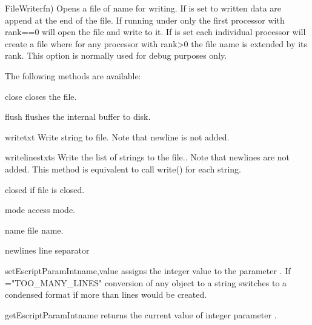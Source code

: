 \begin{classdesc}{FileWriter}{fn)}
Opens a file of name  for writing. If  is set to \True
written data are append at the end of the file.
If running under \MPI only the first processor with rank==0
will open the file and write to it.
If  is set each individual processor will create a file
where for any processor with rank>0 the file name is extended by its rank. This option is normally used for debug purposes only.
\end{classdesc}

The following methods are available:
\begin{methoddesc}[FileWriter]{close}{}
closes the file.
\end{methoddesc}
\begin{methoddesc}[FileWriter]{flush}{}
flushes the internal buffer to disk.
\end{methoddesc}
\begin{methoddesc}[FileWriter]{write}{txt}
Write string  to file.
Note that newline is not added.
\end{methoddesc}
\begin{methoddesc}[FileWriter]{writelines}{txts}
Write the list  of strings to the file..
Note that newlines are not added.
This method is equivalent to call write() for each string.
\end{methoddesc}
\begin{memberdesc}[FileWriter]{closed}
\True if file is closed.
\end{memberdesc}
\begin{memberdesc}[FileWriter]{mode}
access mode.
\end{memberdesc}
\begin{memberdesc}[FileWriter]{name}
file name.
\end{memberdesc}
\begin{memberdesc}[FileWriter]{newlines}
line separator
\end{memberdesc}


\begin{funcdesc}{setEscriptParamInt}{name,value}
assigns the integer value  to the parameter .
If ="TOO_MANY_LINES" conversion of any \Data object to a string switches to a
condensed format if more than  lines would be created.
\end{funcdesc}

\begin{funcdesc}{getEscriptParamInt}{name}
returns the current value of integer parameter .
\end{funcdesc}

